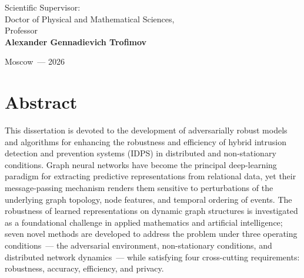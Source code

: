 \begin{titlepage}
\begin{center}
\end{center}

\vspace{1.4cm}

\hfill
\begin{minipage}{0.55\textwidth}
\small
Scientific Supervisor:\\
Doctor of Physical and Mathematical Sciences,\\
Professor\\
\textbf{Alexander Gennadievich Trofimov}
\end{minipage}

\vfill

\begin{center}
Moscow~--- 2026
\end{center}
\end{titlepage}


\chapter*{Abstract}

This dissertation is devoted to the development of adversarially robust models and algorithms for enhancing the robustness and efficiency of hybrid intrusion detection and prevention systems (IDPS) in distributed and non-stationary conditions. Graph neural networks have become the principal deep-learning paradigm for extracting predictive representations from relational data, yet their message-passing mechanism renders them sensitive to perturbations of the underlying graph topology, node features, and temporal ordering of events. The robustness of learned representations on dynamic graph structures is investigated as a foundational challenge in applied mathematics and artificial intelligence; seven novel methods are developed to address the problem under three operating conditions~--- the adversarial environment, non-stationary conditions, and distributed network dynamics~--- while satisfying four cross-cutting requirements: robustness, accuracy, efficiency, and privacy.

